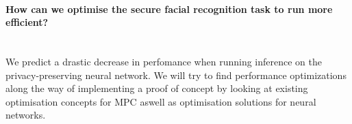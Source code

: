 \paragraph{How can we optimise the secure facial recognition task to run more efficient?}\mbox{}
\\
We predict a drastic decrease in perfomance when running inference on the privacy-preserving neural network. We will try to find performance optimizations along the way of implementing a proof of concept by looking at existing optimisation concepts for MPC aswell as optimisation solutions for neural networks.
